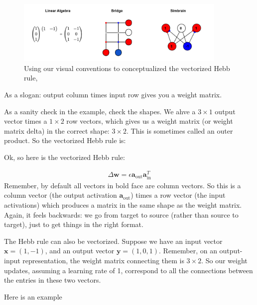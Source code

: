 \begin{figure}[h]
\centering
\includegraphics[width=0.9\textwidth]{images/vectorizedHebb.png}
\caption[Jeff Yoshimi.]{Using our visual conventions to conceptualized the vectorized Hebb rule,}
\label{vectorizedHebb}
\end{figure}

 As a slogan: output column times input row gives you a weight matrix.

As a sanity check in the example, check the shapes. We ahve a $3 \times 1$ output vector times a $1 \times 2$ row vectors, which gives us a weight matrix (or weight matrix delta) in the correct shape: $3 \times 2$. This is sometimes called an outer product.
So the vectorized Hebb rule is: 


Ok, so here is the vectorized Hebb rule:

\begin{eqnarray*}
\Delta \mathbf{w}  = \epsilon \mathbf{a}_{\text{out}} \mathbf{a}_{\text{in}} ^T
\end{eqnarray*}
Remember, by default all vectors in bold face are column vectors.  So this is a column vector (the output activation  $\mathbf{a}_{\text{out}}$) times a row vector (the input activations) which produces a matrix in the same shape as the weight matrix. Again, it feels backwards: we go from target to source (rather than source to target), just to get things in the right format.

The Hebb rule can also be vectorized. Suppose we have an input vector $\mathbf{x} = (1, -1)$, and an output vector $\mathbf{y} = (1,0,1)$. Remember, on an output-input representation, the weight matrix connecting them is $3 \times 2$. So our weight updates, assuming a learning rate of 1, correspond to all the connections between the entries in these two vectors. 

Here is an example


